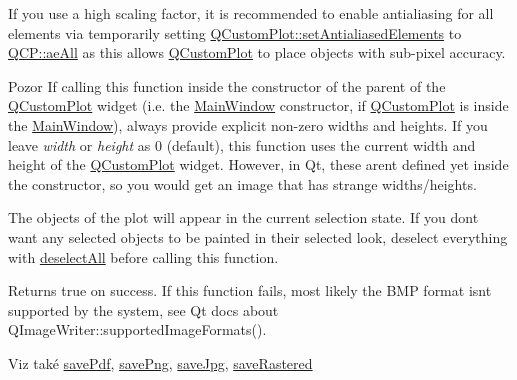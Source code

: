 If you use a high scaling factor, it is recommended to enable antialiasing for all elements via temporarily setting \hyperlink{classQCustomPlot_af6f91e5eab1be85f67c556e98c3745e8}{Q\+Custom\+Plot\+::set\+Antialiased\+Elements} to \hyperlink{namespaceQCP_ae55dbe315d41fe80f29ba88100843a0caa897c232a0ffc8368e7c100ffc59ef31}{Q\+C\+P\+::ae\+All} as this allows \hyperlink{classQCustomPlot}{Q\+Custom\+Plot} to place objects with sub-\/pixel accuracy.

\begin{DoxyWarning}{Pozor}
If calling this function inside the constructor of the parent of the \hyperlink{classQCustomPlot}{Q\+Custom\+Plot} widget (i.\+e. the \hyperlink{classMainWindow}{Main\+Window} constructor, if \hyperlink{classQCustomPlot}{Q\+Custom\+Plot} is inside the \hyperlink{classMainWindow}{Main\+Window}), always provide explicit non-\/zero widths and heights. If you leave {\itshape width} or {\itshape height} as 0 (default), this function uses the current width and height of the \hyperlink{classQCustomPlot}{Q\+Custom\+Plot} widget. However, in Qt, these aren\textquotesingle{}t defined yet inside the constructor, so you would get an image that has strange widths/heights.
\end{DoxyWarning}
The objects of the plot will appear in the current selection state. If you don\textquotesingle{}t want any selected objects to be painted in their selected look, deselect everything with \hyperlink{classQCustomPlot_a9d4808ab925b003054085246c92a257c}{deselect\+All} before calling this function.

Returns true on success. If this function fails, most likely the B\+M\+P format isn\textquotesingle{}t supported by the system, see Qt docs about Q\+Image\+Writer\+::supported\+Image\+Formats().

\begin{DoxySeeAlso}{Viz také}
\hyperlink{classQCustomPlot_a632da44c6d94ea8b271eb483b08b5114}{save\+Pdf}, \hyperlink{classQCustomPlot_a7636261aff1f6d25c9da749ece3fc8b8}{save\+Png}, \hyperlink{classQCustomPlot_a490c722092d1771e8ce4a7a73dfd84ab}{save\+Jpg}, \hyperlink{classQCustomPlot_ab528b84cf92baabe29b1d0ef2f77c93e}{save\+Rastered} 
\end{DoxySeeAlso}
\hypertarget{classQCustomPlot_a490c722092d1771e8ce4a7a73dfd84ab}{}
